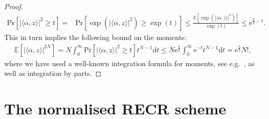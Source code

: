 \begin{proof}
\begin{align*}
  \mathrm{Pr} \left[ | \langle \alpha, z \rangle|^2 \geq t \right]
  =& \mathrm{Pr} \left[ \exp \left( | \langle  \alpha, z \rangle|^2 \right) \geq \exp \left( t \right) \right]
  \leq \frac{ \mathbb{E} \left[ \exp \left( | \langle \alpha,  z \rangle|^2 \right) \right]}{\exp (t)} \leq \mathrm{e}^{\frac{3}{2}-t}.
\end{align*}
This in turn implies the following bound on the moments:
\begin{align*}
  \mathbb{E} \left[ | \langle  \alpha, z \rangle|^{2N} \right]
  =  N \int_0^\infty \mathrm{Pr}\left[ | \langle  \alpha, z \rangle|^2\geq t \right] t^{N-1} \mathrm{d}t \leq N \mathrm{e}^{\frac{3}{2}} \int_0^\infty \mathrm{e}^{-t} t^{N-1} \mathrm{d}t
  = \mathrm{e}^{\frac{3}{2}} N!,
\end{align*}
where we have used a well-known integration formula for moments, see e.g.\ \cite[Prop.~7.1]{Foucart_2013_Mathematical}, as well as integration by parts.
\end{proof}



\section{The normalised RECR scheme}
\label{sec:normalized_recr}


